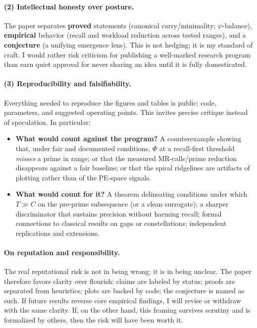 \documentclass[11pt]{article}
\theoremstyle{plain}
\theoremstyle{definition}
\begin{document}
\paragraph{(2) Intellectual honesty over posture.}
The paper separates \textbf{proved} statements (canonical carry/minimality; $\psi$-balance), \textbf{empirical} behavior (recall and workload reduction across tested ranges), and a \textbf{conjecture} (a unifying emergence lens). This is not hedging; it is my standard of craft. I would rather risk criticism for publishing a well-marked research program than earn quiet approval for never sharing an idea until it is fully domesticated.

\paragraph{(3) Reproducibility and falsifiability.}
Everything needed to reproduce the figures and tables is public: code, parameters, and suggested operating points. This invites precise critique instead of speculation. In particular:
\begin{itemize}[leftmargin=1.5em]
  \item \textbf{What would count against the program?} A counterexample showing that, under fair and documented conditions, $\Phi$ at a recall-first threshold \emph{misses} a prime in range; or that the measured MR-calls/prime reduction disappears against a fair baseline; or that the spiral ridgelines are artifacts of plotting rather than of the PE-space signals.
  \item \textbf{What would count for it?} A theorem delineating conditions under which $T\gg C$ on the pre-prime subsequence (or a clean surrogate); a sharper discriminator that sustains precision without harming recall; formal connections to classical results on gaps or constellations; independent replications and extensions.
\end{itemize}

\paragraph{On reputation and responsibility.}
The real reputational risk is not in being wrong; it is in being unclear. The paper therefore favors clarity over flourish: claims are labeled by status; proofs are separated from heuristics; plots are backed by code; the conjecture is named as such. If future results reverse core empirical findings, I will revise or withdraw with the same clarity. If, on the other hand, this framing survives scrutiny and is formalized by others, then the risk will have been worth it.
\end{document}
